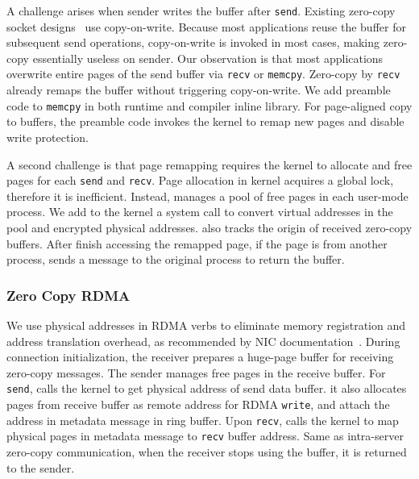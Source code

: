 A challenge arises when sender writes the buffer after \texttt{send}.
Existing zero-copy socket designs~\cite{thadani1995efficient,chu1996zero} use copy-on-write. %
Because most applications reuse the buffer for subsequent send operations, copy-on-write is invoked in most cases, making zero-copy essentially useless on sender.
Our observation is that most applications overwrite entire pages of the send buffer via \texttt{recv} or \texttt{memcpy}. %
Zero-copy by \texttt{recv} already remaps the buffer without triggering copy-on-write.
We add preamble code to \texttt{memcpy} in both \libipc{} runtime and compiler inline library. 
For page-aligned copy to \libipc{} buffers, the preamble code invokes the kernel to remap new pages and disable write protection.

A second challenge is that page remapping requires the kernel to allocate and free pages for each \texttt{send} and \texttt{recv}. Page allocation in kernel acquires a global lock, therefore it is inefficient. Instead, \libipc{} manages a pool of free pages in each user-mode process.
We add to the kernel a system call to convert virtual addresses in the pool and encrypted physical addresses.
\libipc{} also tracks the origin of received zero-copy buffers.
After finish accessing the remapped page, if the page is from another process, \libipc{} sends a message to the original process to return the buffer.

\subsubsection{Zero Copy RDMA}
\label{subsec:zero-copy-rdma}

We use physical addresses in RDMA verbs to eliminate memory registration and address translation overhead, as recommended by NIC documentation~\cite{mellanox}. During connection initialization, the receiver prepares a huge-page buffer for receiving zero-copy messages. The sender manages free pages in the receive buffer. For \texttt{send}, \libipc calls the kernel to get physical address of send data buffer. it also allocates pages from receive buffer as remote address for RDMA \texttt{write}, and attach the address in metadata message in ring buffer. Upon \texttt{recv}, \libipc calls the kernel to map physical pages in metadata message to \texttt{recv} buffer address. 
Same as intra-server zero-copy communication, when the receiver stops using the buffer, it is returned to the sender.

